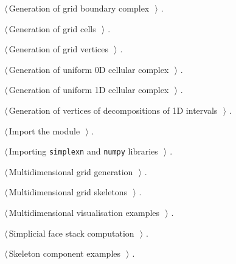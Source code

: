 \documentclass[11pt,oneside]{article}	%
\begin{document}
{\begin{list}{}{\setlength{\itemsep}{-\parsep}\setlength{\itemindent}{-\leftmargin}}
\item $\langle\,$Generation of grid boundary complex\nobreak\ {\footnotesize {}}$\,\rangle$ {\footnotesize {\NWtxtRefIn} .}
\item $\langle\,$Generation of grid cells\nobreak\ {\footnotesize {}}$\,\rangle$ {\footnotesize {\NWtxtRefIn} .}
\item $\langle\,$Generation of grid vertices\nobreak\ {\footnotesize {}}$\,\rangle$ {\footnotesize {\NWtxtRefIn} .}
\item $\langle\,$Generation of uniform 0D cellular complex\nobreak\ {\footnotesize {}}$\,\rangle$ {\footnotesize {\NWtxtRefIn} .}
\item $\langle\,$Generation of uniform 1D cellular complex\nobreak\ {\footnotesize {}}$\,\rangle$ {\footnotesize {\NWtxtRefIn} .}
\item $\langle\,$Generation of vertices of decompositions of 1D intervals\nobreak\ {\footnotesize {}}$\,\rangle$ {\footnotesize {\NWtxtRefIn} .
}
\item $\langle\,$Import the module\nobreak\ {\footnotesize {}}$\,\rangle$ {\footnotesize {\NWtxtRefIn} .
}
\item $\langle\,$Importing \texttt{simplexn} and \texttt{numpy} libraries\nobreak\ {\footnotesize {}}$\,\rangle$ {\footnotesize {\NWtxtRefIn} .}
\item $\langle\,$Multidimensional grid generation\nobreak\ {\footnotesize {}}$\,\rangle$ {\footnotesize {\NWtxtRefIn} .}
\item $\langle\,$Multidimensional grid skeletons\nobreak\ {\footnotesize {}}$\,\rangle$ {\footnotesize {\NWtxtRefIn} .}
\item $\langle\,$Multidimensional visualisation examples\nobreak\ {\footnotesize {}}$\,\rangle$ {\footnotesize {\NWtxtRefIn} .}
\item $\langle\,$Simplicial face stack computation\nobreak\ {\footnotesize {}}$\,\rangle$ {\footnotesize {\NWtxtRefIn} .}
\item $\langle\,$Skeleton component examples\nobreak\ {\footnotesize {}}$\,\rangle$ {\footnotesize {\NWtxtNoRef}.}

\end{list}}
\end{document}
